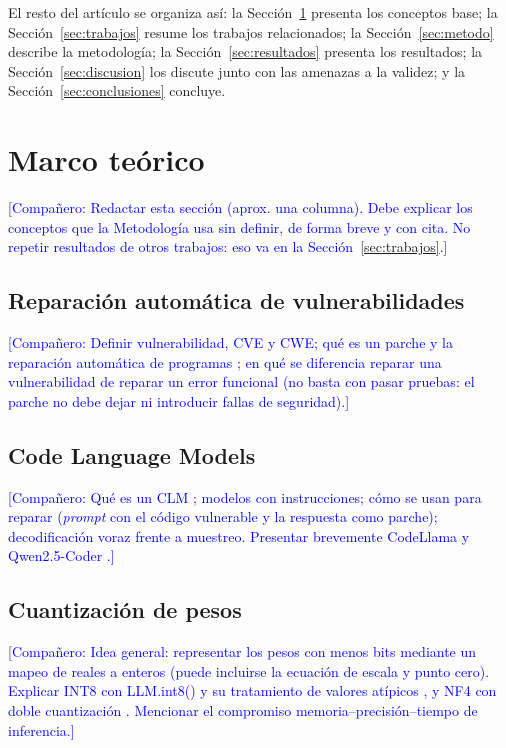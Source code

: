 \documentclass[conference]{IEEEtran}
\newcommand{\comp}[1]{\textcolor{blue}{[Compañero: #1]}}
\begin{document}
El resto del artículo se organiza así: la Sección~\ref{sec:marco} presenta los conceptos base; la Sección~\ref{sec:trabajos} resume los trabajos relacionados; la Sección~\ref{sec:metodo} describe la metodología; la Sección~\ref{sec:resultados} presenta los resultados; la Sección~\ref{sec:discusion} los discute junto con las amenazas a la validez; y la Sección~\ref{sec:conclusiones} concluye.

\section{Marco teórico}\label{sec:marco}

\comp{Redactar esta sección (aprox. una columna). Debe explicar los conceptos que la Metodología usa sin definir, de forma breve y con cita. No repetir resultados de otros trabajos: eso va en la Sección~\ref{sec:trabajos}.}

\subsection{Reparación automática de vulnerabilidades}
\comp{Definir vulnerabilidad, CVE y CWE; qué es un parche y la reparación automática de programas \cite{weimer2009genprog}; en qué se diferencia reparar una vulnerabilidad de reparar un error funcional (no basta con pasar pruebas: el parche no debe dejar ni introducir fallas de seguridad).}

\subsection{Code Language Models}
\comp{Qué es un CLM \cite{jiang2023impact}; modelos con instrucciones; cómo se usan para reparar (\emph{prompt} con el código vulnerable y la respuesta como parche); decodificación voraz frente a muestreo. Presentar brevemente CodeLlama \cite{roziere2023codellama} y Qwen2.5-Coder \cite{hui2024qwen25coder}.}

\subsection{Cuantización de pesos}
\comp{Idea general: representar los pesos con menos bits mediante un mapeo de reales a enteros \cite{jacob2018quantization} (puede incluirse la ecuación de escala y punto cero). Explicar INT8 con LLM.int8() y su tratamiento de valores atípicos \cite{dettmers2022llmint8}, y NF4 con doble cuantización \cite{dettmers2023qlora}. Mencionar el compromiso memoria--precisión--tiempo de inferencia.}
\end{document}
